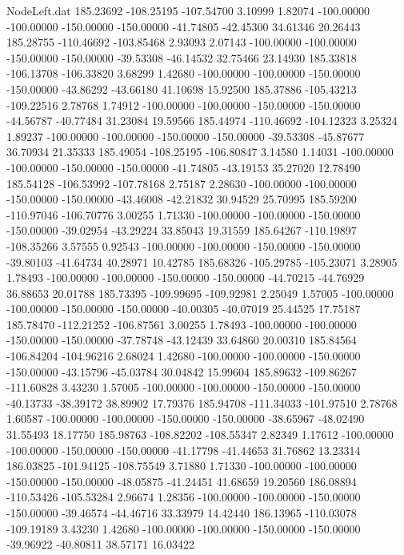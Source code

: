 \begin{filecontents}{NodeLeft.dat}
 185.23692 -108.25195 -107.54700     3.10999    1.82074 -100.00000 -100.00000 -150.00000 -150.00000  -41.74805  -42.45300   34.61346   20.26443
 185.28755 -110.46692 -103.85468     2.93093    2.07143 -100.00000 -100.00000 -150.00000 -150.00000  -39.53308  -46.14532   32.75466   23.14930
 185.33818 -106.13708 -106.33820     3.68299    1.42680 -100.00000 -100.00000 -150.00000 -150.00000  -43.86292  -43.66180   41.10698   15.92500
 185.37886 -105.43213 -109.22516     2.78768    1.74912 -100.00000 -100.00000 -150.00000 -150.00000  -44.56787  -40.77484   31.23084   19.59566
 185.44974 -110.46692 -104.12323     3.25324    1.89237 -100.00000 -100.00000 -150.00000 -150.00000  -39.53308  -45.87677   36.70934   21.35333
 185.49054 -108.25195 -106.80847     3.14580    1.14031 -100.00000 -100.00000 -150.00000 -150.00000  -41.74805  -43.19153   35.27020   12.78490
 185.54128 -106.53992 -107.78168     2.75187    2.28630 -100.00000 -100.00000 -150.00000 -150.00000  -43.46008  -42.21832   30.94529   25.70995
 185.59200 -110.97046 -106.70776     3.00255    1.71330 -100.00000 -100.00000 -150.00000 -150.00000  -39.02954  -43.29224   33.85043   19.31559
 185.64267 -110.19897 -108.35266     3.57555    0.92543 -100.00000 -100.00000 -150.00000 -150.00000  -39.80103  -41.64734   40.28971   10.42785
 185.68326 -105.29785 -105.23071     3.28905    1.78493 -100.00000 -100.00000 -150.00000 -150.00000  -44.70215  -44.76929   36.88653   20.01788
 185.73395 -109.99695 -109.92981     2.25049    1.57005 -100.00000 -100.00000 -150.00000 -150.00000  -40.00305  -40.07019   25.44525   17.75187
 185.78470 -112.21252 -106.87561     3.00255    1.78493 -100.00000 -100.00000 -150.00000 -150.00000  -37.78748  -43.12439   33.64860   20.00310
 185.84564 -106.84204 -104.96216     2.68024    1.42680 -100.00000 -100.00000 -150.00000 -150.00000  -43.15796  -45.03784   30.04842   15.99604
 185.89632 -109.86267 -111.60828     3.43230    1.57005 -100.00000 -100.00000 -150.00000 -150.00000  -40.13733  -38.39172   38.89902   17.79376
 185.94708 -111.34033 -101.97510     2.78768    1.60587 -100.00000 -100.00000 -150.00000 -150.00000  -38.65967  -48.02490   31.55493   18.17750
 185.98763 -108.82202 -108.55347     2.82349    1.17612 -100.00000 -100.00000 -150.00000 -150.00000  -41.17798  -41.44653   31.76862   13.23314
 186.03825 -101.94125 -108.75549     3.71880    1.71330 -100.00000 -100.00000 -150.00000 -150.00000  -48.05875  -41.24451   41.68659   19.20560
 186.08894 -110.53426 -105.53284     2.96674    1.28356 -100.00000 -100.00000 -150.00000 -150.00000  -39.46574  -44.46716   33.33979   14.42440
 186.13965 -110.03078 -109.19189     3.43230    1.42680 -100.00000 -100.00000 -150.00000 -150.00000  -39.96922  -40.80811   38.57171   16.03422

\end{filecontents}

